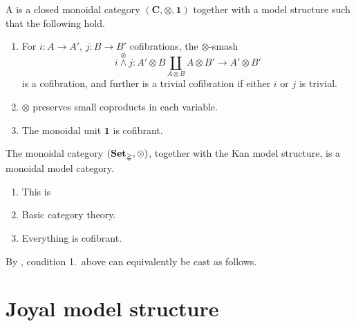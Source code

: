 \documentclass[main.tex]{subfiles}
\begin{document}
\begin{definition}
  A  is a closed monoidal category $(\mathbf{C}, \otimes, \mathbf{1})$ together with a model structure such that the following hold.
  \begin{enumerate}
    \item For $i\colon A \to A'$, $j\colon B \to B'$ cofibrations, the $\otimes$-smash
      \begin{equation*}
        i \overset{\otimes}{\wedge} j\colon A' \otimes B \coprod_{A \otimes B} A \otimes B' \to A' \otimes B'
      \end{equation*}
      is a cofibration, and further is a trivial cofibration if either $i$ or $j$ is trivial.

    \item $\otimes$ preserves small coproducts in each variable.

    \item The monoidal unit $\mathbf{1}$ is cofibrant.
  \end{enumerate}
\end{definition}

\begin{example}
  The monoidal category $(\mathbf{Set}_{\mathbb{\Delta}}, \otimes)$, together with the Kan model structure, is a monoidal model category.
  \begin{enumerate}
    \item This is

    \item Basic category theory.

    \item Everything is cofibrant.
  \end{enumerate}
\end{example}

\begin{note}
  By \cite[Lemma 67]{angus_higher_cats}, condition 1.\ above can equivalently be cast as follows.
\end{note}

\section{Joyal model structure}
\label{sec:joyal_model_structure}
\end{document}
